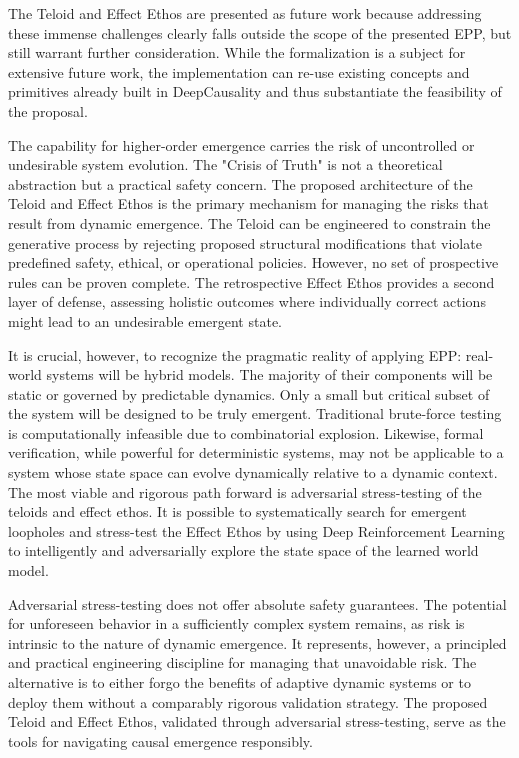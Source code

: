 The Teloid and Effect Ethos are presented as future work because addressing these immense challenges clearly
falls outside the scope of the presented EPP, but still warrant further consideration. 
While the formalization is
a subject for extensive future work, the implementation can re-use existing concepts and primitives already built in
DeepCausality and thus substantiate the feasibility of the proposal.


The capability for higher-order emergence carries the risk of uncontrolled or undesirable system evolution. The "Crisis of Truth" is not a theoretical abstraction but a practical safety concern. The proposed architecture of the Teloid and Effect Ethos is the primary mechanism for managing the risks that result from dynamic emergence. The Teloid can be engineered to constrain the generative process by rejecting proposed structural modifications that violate predefined safety, ethical, or operational policies. However, no set of prospective rules can be proven complete. The retrospective Effect Ethos provides a second layer of defense, assessing holistic outcomes where individually correct actions might lead to an undesirable emergent state. 

It is crucial, however, to recognize the pragmatic reality of applying EPP: real-world systems will be hybrid models. The majority of their components will be static or governed by predictable dynamics. Only a small but critical subset of the system will be designed to be truly emergent.
Traditional brute-force testing is computationally infeasible due to combinatorial explosion. 
Likewise, formal verification, while powerful for deterministic systems, may not be applicable to a system whose state space can evolve dynamically relative to a dynamic context.
The most viable and rigorous path forward is adversarial stress-testing of the teloids and effect ethos. 
It is possible to systematically search for emergent loopholes and stress-test the Effect Ethos
by using Deep Reinforcement Learning to intelligently and adversarially explore the state space of the learned world model.

Adversarial stress-testing  does not offer absolute safety guarantees. The potential for unforeseen behavior in a sufficiently complex system remains, as risk is intrinsic to the nature of dynamic emergence. It represents, however, a principled and practical engineering discipline for managing that unavoidable risk. 
The alternative is to either forgo the benefits of adaptive dynamic systems or to deploy them without a comparably rigorous validation strategy. 
The proposed Teloid and Effect Ethos, validated through adversarial stress-testing, serve as the tools for navigating causal emergence responsibly.

